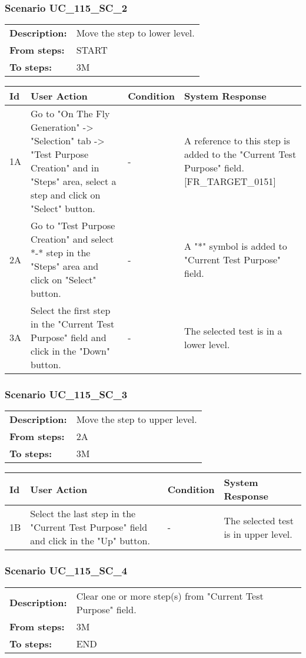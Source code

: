 \documentclass[a4paper,11pt]{article}
\newcommand{\bl}{\\ \hline}
\begin{document}
\subsubsection*{Scenario UC_115_SC_2}
\begin{tabular}{p{1in}p{4in}}
{\bf Description:} & Move the step to lower level. \\
{\bf From steps:} & START \\
{\bf To steps:} & 3M \\
\end{tabular}
 
\begin{tabular}{|p{0.8in}|p{1.6in}|p{1.6in}|p{1.6in}|}
\hline
Id & User Action & Condition & System Response  \bl 
1A & Go to "On The Fly Generation" -> "Selection" tab -> "Test Purpose Creation" and in "Steps" area, select a step and click on "Select" button. & - & A reference to this step is added to the "Current Test Purpose" field.  [FR_TARGET_0151] \bl 
2A & Go to "Test Purpose Creation" and select *-*  step in the "Steps" area and click on "Select" button. & - & A "*" symbol is added to "Current Test Purpose" field. \bl 
3A & Select the first step in the "Current Test Purpose" field and click in the "Down" button. & - & The selected test is in a lower level. \bl 
\end{tabular}
\subsubsection*{Scenario UC_115_SC_3}
\begin{tabular}{p{1in}p{4in}}
{\bf Description:} & Move the step to upper level. \\
{\bf From steps:} & 2A \\
{\bf To steps:} & 3M \\
\end{tabular}
 
\begin{tabular}{|p{0.8in}|p{1.6in}|p{1.6in}|p{1.6in}|}
\hline
Id & User Action & Condition & System Response  \bl 
1B & Select the last step in the "Current Test Purpose" field and click in the "Up" button. & - & The selected test is in upper level. \bl 
\end{tabular}
\subsubsection*{Scenario UC_115_SC_4}
\begin{tabular}{p{1in}p{4in}}
{\bf Description:} & Clear one or more step(s) from "Current Test Purpose" field. \\
{\bf From steps:} & 3M \\
{\bf To steps:} & END \\
\end{tabular}
 
\end{document}
